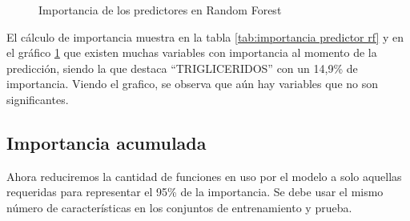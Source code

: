    \begin{center}
    	\begin{figure}[H]
	\centering
	\caption{Importancia de los predictores en Random Forest}
	\label{fig:ip}
	\end{figure}
\end{center}

    
    El cálculo de importancia muestra en la tabla \ref{tab:importancia predictor rf} y en el gráfico \ref{fig:ip} que existen muchas variables con
importancia al momento de la predicción, siendo la que destaca
``TRIGLICERIDOS'' con un 14,9\% de importancia. Viendo el grafico, se
observa que aún hay variables que no son significantes.

    \hypertarget{importancia-acumulada}{%
\subsection{Importancia acumulada}\label{importancia-acumulada}}

Ahora reduciremos la cantidad de funciones en uso por el modelo a solo
aquellas requeridas para representar el 95\% de la importancia. Se debe
usar el mismo número de características en los conjuntos de
entrenamiento y prueba.

